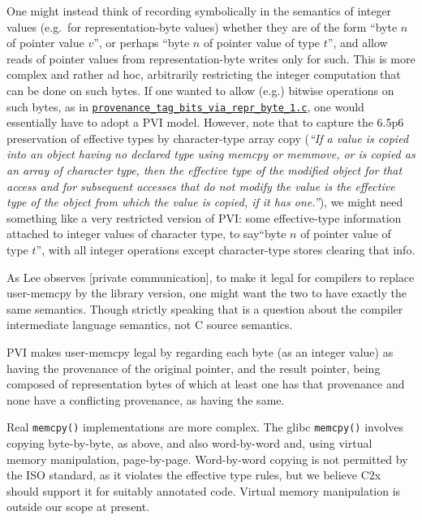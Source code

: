 \documentclass[acmsmall,review,screen]{acmart}\settopmatter{printfolios=true,printccs=false,printacmref=false}
\newcommand{\mytesturl}[1]{https://cerberus.cl.cam.ac.uk/cerberus?defacto/#1}
\newcommand{\mytestlink}[2]{\href{\mytesturl{#1}}{#2}}
\newcommand{\mylsttestlink}[1]{\mytestlink{#1}{\lstinline{#1}}}
\newcommand{\myfooexamplename}[1]{\mylsttestlink{#1}}
\begin{document}
One might instead think of 
recording symbolically in the semantics of integer values (e.g.~for
representation-byte values) whether they are of the form ``byte $n$ of pointer
value $v$'', or perhaps ``byte $n$ of pointer value of type $t$'', and allow reads of pointer values from
representation-byte writes only for such.  This is more complex and
  rather ad hoc, arbitrarily restricting the integer computation that
  can be done on such bytes.  If one wanted to allow (e.g.)
  bitwise operations on such bytes, as in
  \myfooexamplename{provenance_tag_bits_via_repr_byte_1.c}, one would
  essentially have to adopt a PVI model. 
%
However, note that to capture the 6.5p6 preservation of effective
types by character-type array copy (\emph{``If a value is copied into an object having no declared type using
memcpy or memmove, or is copied as an array of character type, then
the effective type
of the modified object for that access and for subsequent accesses
that do not modify the
 value is the effective type of the object from which the value is
copied, if it has one.''}), we might need something like a very
restricted version of PVI: some effective-type information attached to
integer values of character type, to say``byte $n$ of pointer value of type $t$'', with all integer
operations except character-type stores clearing that info. 


As Lee observes [private communication], to make it legal for
compilers to replace user-memcpy by the library version, one might
want the two to have exactly the same semantics.  Though strictly
speaking that is a question about the compiler intermediate language
semantics, not C source semantics. 

PVI makes user-memcpy legal by regarding each 
byte (as an integer value) as having the provenance of the original
pointer, and the result pointer, being composed of representation
bytes of which at least one has that provenance and none have a conflicting provenance, as having the same.
%
%

Real \lstinline{memcpy()} implementations are more complex. The glibc \lstinline{memcpy()}\cite{glibc_memcpy}
involves copying byte-by-byte, as
above, and also
word-by-word and, using virtual memory manipulation, page-by-page.
Word-by-word copying is not permitted by the ISO standard, as it
violates the effective type rules, but we believe C2x should support
it for suitably annotated code. Virtual memory manipulation is outside our scope
at present. 
\end{document}
